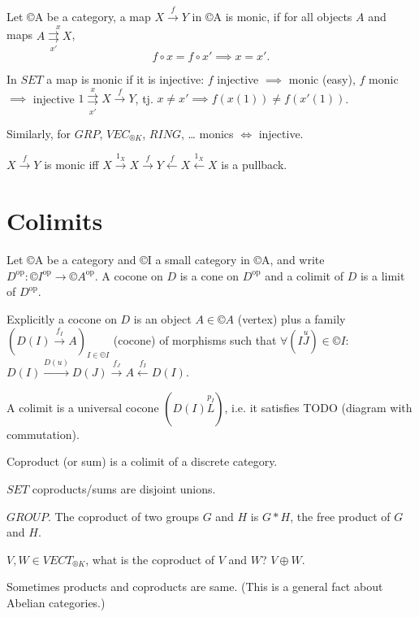 \documentclass[12pt]{article}					%
\newcommand{\op}{^{\text{op}}}
\begin{document}
\begin{definice}[Monics]
	Let ©A be a category, a map $X \overset{f}\rightarrow Y$ in ©A is monic, if for all objects $A$ and maps $A \overset{x}{\underset{x'}\rightrightarrows X}$,
	$$ f ∘ x = f ∘ x' \implies x = x'. $$
\end{definice}

\begin{priklad}
	In $SET$ a map is monic if it is injective: $f$ injective $\implies$ monic (easy), $f$ monic $\implies$ injective $1 \overset{x}{\underset{x'} \rightrightarrows} X \overset{f}\rightarrow Y$, tj. $x ≠ x' \implies f(x(1)) ≠ f(x'(1))$.
\end{priklad}

\begin{priklad}
	Similarly, for $GRP$, $VEC_{®K}$, $RING$, … monics $\Leftrightarrow$ injective.
\end{priklad}

\begin{lemma}
	$X \overset{f}\rightarrow Y$ is monic iff $X \overset{1_X}\rightarrow X \overset{f}\rightarrow Y \overset{f}\leftarrow X \overset{1_X}\leftarrow X$ is a pullback.
\end{lemma}

\section{Colimits}
\begin{definice}
	Let ©A be a category and ©I a small category in ©A, and write $D\op: ©I\op \rightarrow ©A\op$. A cocone on $D$ is a cone on $D\op$ and a colimit of $D$ is a limit of $D\op$.

	Explicitly a cocone on $D$ is an object $A \in ©A$ (vertex) plus a family $(D(I) \overset{f_I}\rightarrow A)_{I \in ©I}$ (cocone) of morphisms such that $\forall (I \overset{u} J) \in ©I$: $D(I) \overset{D(u)}\rightarrow D(J) \overset{f_J} \rightarrow A \overset{f_I} \leftarrow D(I)$.

	A colimit is a universal cocone $(D(I) \overset{p_I} L)$, i.e. it satisfies TODO (diagram with commutation).
\end{definice}

\begin{definice}
	Coproduct (or sum) is a colimit of a discrete category.
\end{definice}

\begin{priklady}
	$SET$ coproducts/sums are disjoint unions.

	$GROUP$. The coproduct of two groups $G$ and $H$ is $G*H$, the free product of $G$ and $H$.

	$V, W \in VECT_{®K}$, what is the coproduct of $V$ and $W$? $V \oplus W$.

	\begin{dusledekin}
		Sometimes products and coproducts are same. (This is a general fact about Abelian categories.)
	\end{dusledekin}
\end{priklady}
\end{document}

